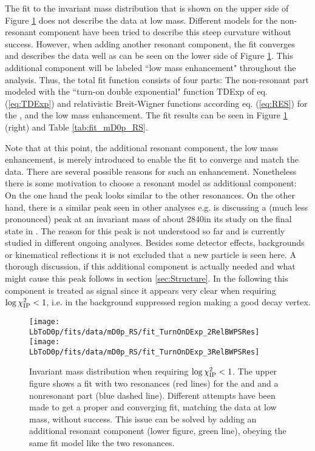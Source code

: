 The fit to the invariant \Dz\proton mass distribution that is shown on the upper side of Figure \ref{fig:fit_mD0p_RS} does not describe the data at low \Dz\proton mass.
Different models for the non-resonant component have been tried to describe this steep curvature without success.
However, when adding another resonant component, the fit converges and describes the data well as can be seen on the lower side of Figure \ref{fig:fit_mD0p_RS}.
This additional component will be labeled ``low mass enhancement" throughout the analysis.
Thus, the total fit function consists of four parts: 
The non-resonant part modeled with the ``turn-on double exponential" function TDExp of eq. (\ref{eq:TDExp}) and relativistic Breit-Wigner functions according eq. (\ref{eq:RES}) for the \LcResI, \LcResII and the low mass enhancement. 
The fit results can be seen in Figure \ref{fig:fit_mD0p_RS} (right) and Table \ref{tab:fit_mD0p_RS}.

Note that at this point, the additional resonant component, the low mass enhancement, is merely introduced to enable the fit to converge and match the data.
There are several possible reasons for such an enhancement.
Nonetheless there is some motivation to choose a resonant model as additional component:
On the one hand the peak looks similar to the other resonances.
On the other hand, there is a similar peak seen in other analyses e.g. \babar is discussing a (much less pronounced) peak at an invariant \Dz\proton mass of about 2840\mev in its study on the \Dz\proton final state in \cite{BaBar_D0p}.
The reason for this peak is not understood so far and is currently studied in different ongoing \lhcb analyses.
Besides some detector effects, backgrounds or kinematical reflections it is not excluded that a new particle is seen here.
A thorough discussion, if this additional component is actually needed and what might cause this peak follows in section \ref{sec:Structure}.
In the following this component is treated as signal since it appears very clear when requiring $\log \chi^2_{\text{IP}} < 1$, i.e. in the background suppressed region making a good decay vertex.
\begin{figure}[ptb]
    \centering
	\texttt{[image: LbToD0p/fits/data/mD0p\_RS/fit\_TurnOnDExp\_2RelBWPSRes]} \\
	\texttt{[image: LbToD0p/fits/data/mD0p\_RS/fit\_TurnOnDExp\_3RelBWPSRes]}
	\caption{Invariant \Dz\proton mass distribution when requiring $\log \chi^2_{\text{IP}} < 1$. 
             The upper figure shows a fit with two resonances (red lines) for the \LcResI and \LcResII and a nonresonant part (blue dashed line). 
             Different attempts have been made to get a proper and converging fit, matching the data at low \Dz\proton mass, without success. 
             This issue can be solved by adding an additional resonant component (lower figure, green line), obeying the same fit model like the two resonances.}
    \label{fig:fit_mD0p_RS}
\end{figure}


